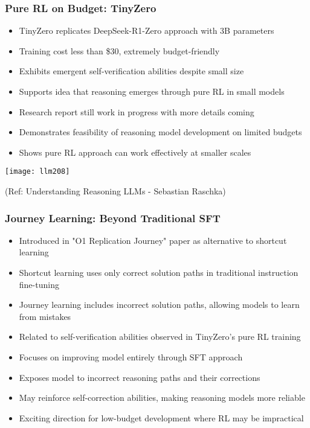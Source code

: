 \begin{frame}[fragile]\frametitle{Pure RL on Budget: TinyZero}
      \begin{itemize}
	\item TinyZero replicates DeepSeek-R1-Zero approach with 3B parameters
	\item Training cost less than \$30, extremely budget-friendly
	\item Exhibits emergent self-verification abilities despite small size
	\item Supports idea that reasoning emerges through pure RL in small models
	\item Research report still work in progress with more details coming
	\item Demonstrates feasibility of reasoning model development on limited budgets
	\item Shows pure RL approach can work effectively at smaller scales
	  \end{itemize}
	  
  		\begin{center}
		\texttt{[image: llm208]}
		
		{\tiny (Ref: Understanding Reasoning LLMs - Sebastian Raschka)}

		\end{center}	  
\end{frame}

\begin{frame}[fragile]\frametitle{Journey Learning: Beyond Traditional SFT}
      \begin{itemize}
	\item Introduced in "O1 Replication Journey" paper as alternative to shortcut learning
	\item Shortcut learning uses only correct solution paths in traditional instruction fine-tuning
	\item Journey learning includes incorrect solution paths, allowing models to learn from mistakes
	\item Related to self-verification abilities observed in TinyZero's pure RL training
	\item Focuses on improving model entirely through SFT approach
	\item Exposes model to incorrect reasoning paths and their corrections
	\item May reinforce self-correction abilities, making reasoning models more reliable
	\item Exciting direction for low-budget development where RL may be impractical
	  \end{itemize}
	  
  
\end{frame}


